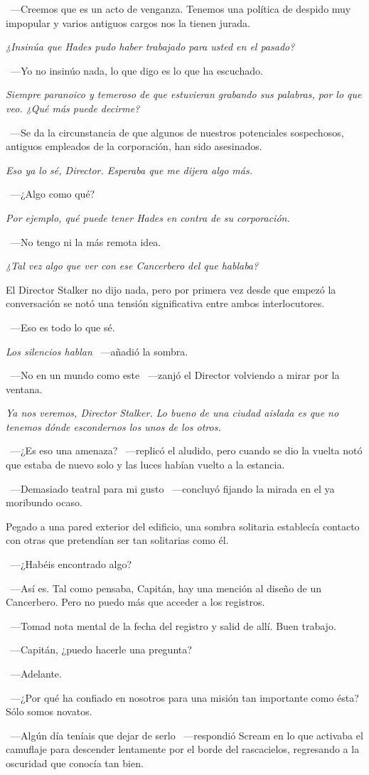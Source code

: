~---Creemos que es un acto de venganza. Tenemos una política de despido muy impopular y varios antiguos cargos nos la tienen jurada.

\emph{¿Insinúa que Hades pudo haber trabajado para usted en el pasado?}

~---Yo no insinúo nada, lo que digo es lo que ha escuchado.

\emph{Siempre paranoico y temeroso de que estuvieran grabando sus palabras, por lo que veo. ¿Qué más puede decirme?}

~---Se da la circunstancia de que algunos de nuestros potenciales sospechosos, antiguos empleados de la corporación, han sido asesinados.

\emph{Eso ya lo sé, Director. Esperaba que me dijera algo más.}

~---¿Algo como qué?

\emph{Por ejemplo, qué puede tener Hades en contra de su corporación.}

~---No tengo ni la más remota idea.

\emph{¿Tal vez algo que ver con ese Cancerbero del que hablaba?}

El Director Stalker no dijo nada, pero por primera vez desde que empezó la conversación se notó una tensión significativa entre ambos interlocutores.

~---Eso es todo lo que sé.

\emph{Los silencios hablan} ~---añadió la sombra.

~---No en un mundo como este ~---zanjó el Director volviendo a mirar por la ventana.

\emph{Ya nos veremos, Director Stalker. Lo bueno de una ciudad aislada es que no tenemos dónde escondernos los unos de los otros.}

~---¿Es eso una amenaza? ~---replicó el aludido, pero cuando se dio la vuelta notó que estaba de nuevo solo y las luces habían vuelto a la estancia.

~---Demasiado teatral para mi gusto ~---concluyó fijando la mirada en el ya moribundo ocaso.
 
\parbreak
Pegado a una pared exterior del edificio, una sombra solitaria establecía contacto con otras que pretendían ser tan solitarias como él.

~---¿Habéis encontrado algo?

~---Así es. Tal como pensaba, Capitán, hay una mención al diseño de un Cancerbero. Pero no puedo más que acceder a los registros.

~---Tomad nota mental de la fecha del registro y salid de allí. Buen trabajo.

~---Capitán, ¿puedo hacerle una pregunta?

~---Adelante.

~---¿Por qué ha confiado en nosotros para una misión tan importante como ésta? Sólo somos novatos.

~---Algún día teníais que dejar de serlo ~---respondió Scream en lo que activaba el camuflaje para descender lentamente por el borde del rascacielos, regresando a la oscuridad que conocía tan bien.

\endinput
